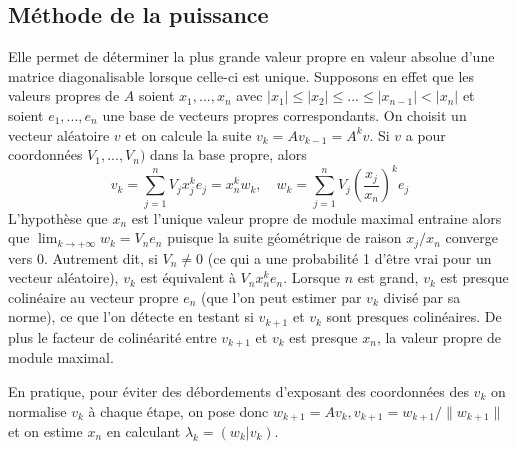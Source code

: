 \documentclass[a4paper,11pt]{book}
\begin{document}
\begin{giacjshere}
\subsection{Méthode de la puissance} 
Elle permet de déterminer la plus grande valeur propre en valeur absolue
d'une matrice diagonalisable lorsque celle-ci est unique.
Supposons en effet que les valeurs propres de $A$ soient
$x_1,...,x_n$ avec $|x_1| \leq |x_2| \leq ... \leq |x_{n-1}| < |x_n|$
et soient $e_1,...,e_n$ une base de vecteurs propres correspondants.
On choisit un vecteur aléatoire $v$ et on calcule la suite
$v_k=Av_{k-1}=A^k v $. Si $v$ a pour coordonnées $V_1,...,V_n)$ 
dans la base propre, alors
\[ v_k = \sum_{j=1}^n V_j x_j^k e_j 
= x_n^k w_k, \quad w_k=\sum_{j=1}^n V_j \left(\frac{x_j}{x_n}\right)^k e_j
\]
L'hypothèse que $x_n$ est l'unique valeur propre
de module maximal entraine alors 
que $\lim_{k \rightarrow +\infty} w_k = V_n e_n$ puisque la suite
géométrique de raison $x_j/x_n$ converge vers 0.
Autrement dit, si $V_n\neq 0$ (ce qui a une probabilité 1 d'être
vrai pour un vecteur aléatoire), 
$v_k$ est équivalent à $V_n x_n^k e_n$. Lorsque $n$
est grand, $v_k$ est presque colinéaire au vecteur propre
$e_n$ (que l'on peut estimer par $v_k$ divisé par sa norme), 
ce que l'on détecte en testant si $v_{k+1}$ et $v_k$
sont presques colinéaires. De plus le facteur de colinéarité
entre $v_{k+1}$ et $v_k$ est presque $x_n$, la valeur propre
de module maximal.

En pratique, pour \'eviter des d\'ebordements d'exposant des
coordonn\'ees des $v_k$ on normalise $v_k$ \`a chaque
\'etape, on pose donc $w_{k+1}=Av_k, v_{k+1}=w_{k+1}/\|w_{k+1}\|$ 
et on estime $x_n$ en calculant $\lambda_k=(w_k|v_k)$.


\end{giacjshere}
\end{document}

